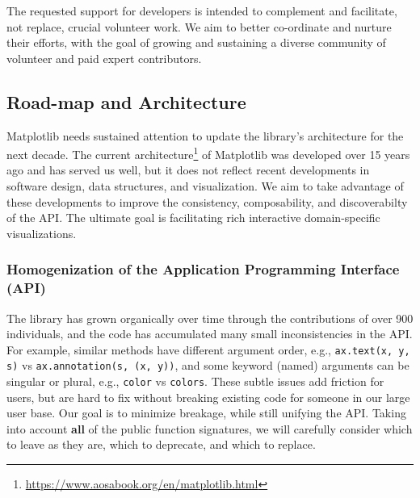 \documentclass[11pt,letterpaper]{article}  %
\begin{document}
The requested support for developers is intended to complement and facilitate, not replace, crucial volunteer work. We aim to better co-ordinate and nurture their efforts, with the goal of growing and sustaining a diverse community of volunteer and paid expert contributors. 





\subsection{Road-map and Architecture}
Matplotlib needs sustained attention to update the library's architecture for the next decade.
The current architecture\footnote{\url{https://www.aosabook.org/en/matplotlib.html}} of Matplotlib was 
developed over 15 years ago \cite{Hunter:2007} and has served us well, but it does not reflect recent developments in software design, data structures, and visualization. We aim to take advantage of these developments to improve the consistency, composability, and discoverabilty of the API. The ultimate goal is facilitating rich interactive domain-specific visualizations.



\subsubsection{Homogenization of the Application Programming Interface (API)}
\label{sec:api_hom}
The library has grown organically over time through the contributions of over 900 individuals, and the code has accumulated many small inconsistencies in the API. For example, similar methods have different
argument order, e.g., \texttt{ax.text(x, y, s)} vs
\texttt{ax.annotation(s, (x, y))}, and some keyword (named) arguments can be
singular or plural, e.g., \texttt{color} vs \texttt{colors}.  These
subtle issues add friction for users, but are hard to fix without
breaking existing code for someone in our large user base.  Our goal is
to minimize breakage, while still unifying the API. Taking into account
\textbf{all} of the public function signatures, we will carefully consider which to leave as
they are, which to deprecate, and which to replace.
\end{document}
